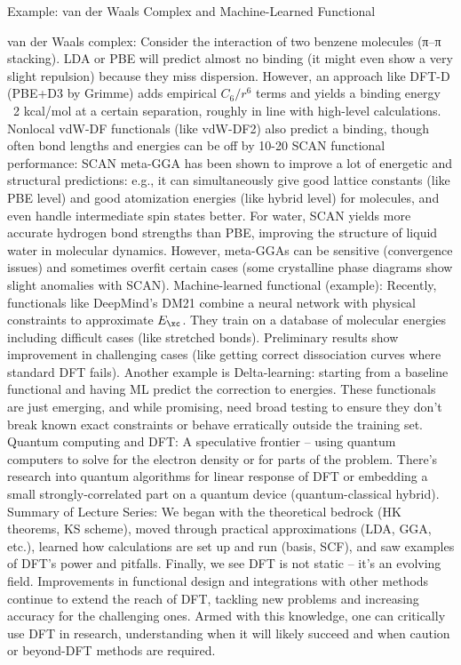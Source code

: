 \begin{frame}{Example: van der Waals Complex and Machine-Learned Functional}

van der Waals complex: Consider the interaction of two benzene molecules (π–π stacking). LDA or PBE will predict almost no binding (it might even show a very slight repulsion) because they miss dispersion. However, an approach like DFT-D (PBE+D3 by Grimme) adds empirical $C_6/r^6$ terms and yields a binding energy ~2 kcal/mol at a certain separation, roughly in line with high-level calculations. Nonlocal vdW-DF functionals (like vdW-DF2) also predict a binding, though often bond lengths and energies can be off by 10-20%
SCAN functional performance: SCAN meta-GGA has been shown to improve a lot of energetic and structural predictions: e.g., it can simultaneously give good lattice constants (like PBE level) and good atomization energies (like hybrid level) for molecules, and even handle intermediate spin states better. For water, SCAN yields more accurate hydrogen bond strengths than PBE, improving the structure of liquid water in molecular dynamics. However, meta-GGAs can be sensitive (convergence issues) and sometimes overfit certain cases (some crystalline phase diagrams show slight anomalies with SCAN).
Machine-learned functional (example): Recently, functionals like DeepMind’s DM21 combine a neural network with physical constraints to approximate $E_{\xc}$. They train on a database of molecular energies including difficult cases (like stretched bonds). Preliminary results show improvement in challenging cases (like getting correct dissociation curves where standard DFT fails). Another example is Delta-learning: starting from a baseline functional and having ML predict the correction to energies. These functionals are just emerging, and while promising, need broad testing to ensure they don’t break known exact constraints or behave erratically outside the training set.
Quantum computing and DFT: A speculative frontier – using quantum computers to solve for the electron density or for parts of the problem. There’s research into quantum algorithms for linear response of DFT or embedding a small strongly-correlated part on a quantum device (quantum-classical hybrid).
Summary of Lecture Series: We began with the theoretical bedrock (HK theorems, KS scheme), moved through practical approximations (LDA, GGA, etc.), learned how calculations are set up and run (basis, SCF), and saw examples of DFT’s power and pitfalls. Finally, we see DFT is not static – it’s an evolving field. Improvements in functional design and integrations with other methods continue to extend the reach of DFT, tackling new problems and increasing accuracy for the challenging ones. Armed with this knowledge, one can critically use DFT in research, understanding when it will likely succeed and when caution or beyond-DFT methods are required. \end{frame}


